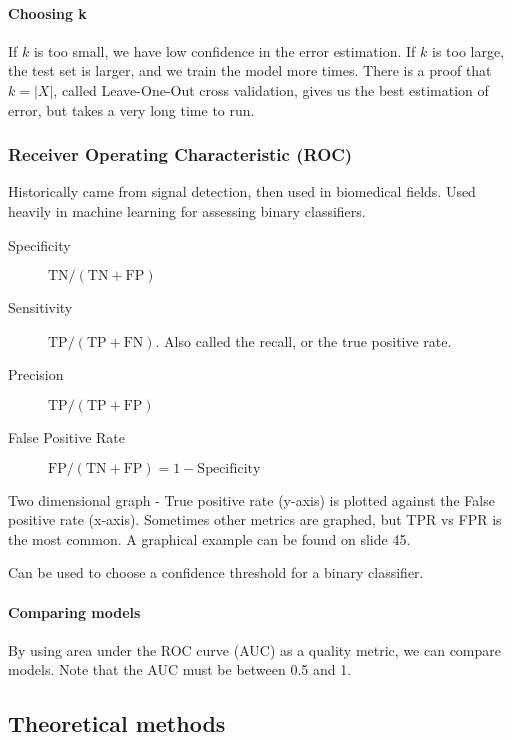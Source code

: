 \documentclass{idc_msc}
\begin{document}
\paragraph{Choosing k}

If \(k\) is too small, we have low confidence in the error estimation.
If \(k\) is too large, the test set is larger, and we train the model more times.
There is a proof that \(k = |X|\), called Leave-One-Out cross validation, gives us the best estimation of error, but takes a very long time to run.

\subsubsection{Receiver Operating Characteristic (ROC)}

Historically came from signal detection, then used in biomedical fields.
Used heavily in machine learning for assessing binary classifiers.

\begin{description}
  \item[Specificity] \(\text{TN} / (\text{TN} + \text{FP})\)
  \item[Sensitivity] \(\text{TP} / (\text{TP} + \text{FN})\). Also called the recall, or the true positive rate.
  \item[Precision] \(\text{TP} / (\text{TP} + \text{FP})\)
  \item[False Positive Rate] \(\text{FP} / (\text{TN} + \text{FP}) = 1 - \text{Specificity}\)
\end{description}

Two dimensional graph - True positive rate (y-axis) is plotted against the False positive rate (x-axis).
Sometimes other metrics are graphed, but TPR vs FPR is the most common.
A graphical example can be found on slide 45.

Can be used to choose a confidence threshold for a binary classifier.

\paragraph{Comparing models}

By using area under the ROC curve (AUC) as a quality metric, we can compare models.
Note that the AUC must be between 0.5 and 1.

\subsection{Theoretical methods}
\end{document}
